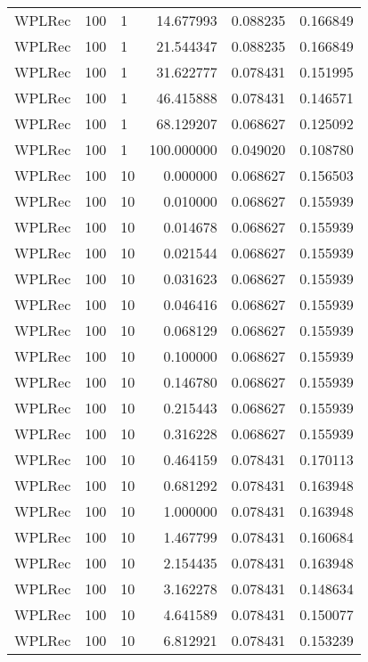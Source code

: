 \begin{tabular}{lllrrr}
 WPLRec &  100 &      1 &   14.677993 &     0.088235 &  0.166849 \\
 WPLRec &  100 &      1 &   21.544347 &     0.088235 &  0.166849 \\
 WPLRec &  100 &      1 &   31.622777 &     0.078431 &  0.151995 \\
 WPLRec &  100 &      1 &   46.415888 &     0.078431 &  0.146571 \\
 WPLRec &  100 &      1 &   68.129207 &     0.068627 &  0.125092 \\
 WPLRec &  100 &      1 &  100.000000 &     0.049020 &  0.108780 \\
 WPLRec &  100 &     10 &    0.000000 &     0.068627 &  0.156503 \\
 WPLRec &  100 &     10 &    0.010000 &     0.068627 &  0.155939 \\
 WPLRec &  100 &     10 &    0.014678 &     0.068627 &  0.155939 \\
 WPLRec &  100 &     10 &    0.021544 &     0.068627 &  0.155939 \\
 WPLRec &  100 &     10 &    0.031623 &     0.068627 &  0.155939 \\
 WPLRec &  100 &     10 &    0.046416 &     0.068627 &  0.155939 \\
 WPLRec &  100 &     10 &    0.068129 &     0.068627 &  0.155939 \\
 WPLRec &  100 &     10 &    0.100000 &     0.068627 &  0.155939 \\
 WPLRec &  100 &     10 &    0.146780 &     0.068627 &  0.155939 \\
 WPLRec &  100 &     10 &    0.215443 &     0.068627 &  0.155939 \\
 WPLRec &  100 &     10 &    0.316228 &     0.068627 &  0.155939 \\
 WPLRec &  100 &     10 &    0.464159 &     0.078431 &  0.170113 \\
 WPLRec &  100 &     10 &    0.681292 &     0.078431 &  0.163948 \\
 WPLRec &  100 &     10 &    1.000000 &     0.078431 &  0.163948 \\
 WPLRec &  100 &     10 &    1.467799 &     0.078431 &  0.160684 \\
 WPLRec &  100 &     10 &    2.154435 &     0.078431 &  0.163948 \\
 WPLRec &  100 &     10 &    3.162278 &     0.078431 &  0.148634 \\
 WPLRec &  100 &     10 &    4.641589 &     0.078431 &  0.150077 \\
 WPLRec &  100 &     10 &    6.812921 &     0.078431 &  0.153239 \\

\end{tabular}
